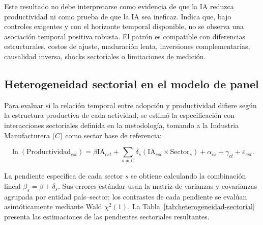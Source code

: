 \documentclass[12pt,a4paper]{article}
\begin{document}
Este resultado no debe interpretarse como evidencia de que la IA reduzca productividad ni como prueba de que la IA sea ineficaz. Indica que, bajo controles exigentes y con el horizonte temporal disponible, no se observa una asociación temporal positiva robusta. El patrón es compatible con diferencias estructurales, costos de ajuste, maduración lenta, inversiones complementarias, causalidad inversa, shocks sectoriales o limitaciones de medición.

\subsection{Heterogeneidad sectorial en el modelo de panel}

Para evaluar si la relación temporal entre adopción y productividad difiere según la estructura productiva de cada actividad, se estimó la especificación con interacciones sectoriales definida en la metodología, tomando a la Industria Manufacturera ($C$) como sector base de referencia:

\begin{equation}
 \ln(\text{Productividad}_{cst}) = \beta \text{IA}_{cst} + \sum_{s \neq C} \delta_s(\text{IA}_{cst} \times \text{Sector}_s) + \alpha_{cs} + \gamma_{ct} + \varepsilon_{cst}.
\end{equation}

La pendiente específica de cada sector $s$ se obtiene calculando la combinación lineal $\beta_s = \beta + \delta_s$. Sus errores estándar usan la matriz de varianzas y covarianzas agrupada por entidad país--sector; los contrastes de cada pendiente se evalúan asintóticamente mediante Wald $\chi^2(1)$. La Tabla~\ref{tab:heterogeneidad-sectorial} presenta las estimaciones de las pendientes sectoriales resultantes.
\end{document}
